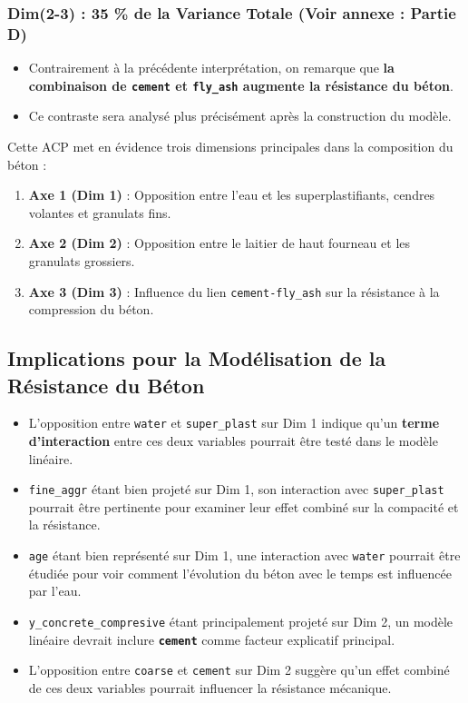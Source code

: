 \documentclass[
  12pt,
]{article}
\providecommand{\tightlist}{%
  \setlength{\itemsep}{0pt}\setlength{\parskip}{0pt}}
\begin{document}
\subsubsection{Dim(2-3) : 35 \% de la Variance Totale (Voir annexe :
Partie D)}\label{dim2-3-35-de-la-variance-totale-voir-annexe-partie-d}

\begin{itemize}
\tightlist
\item
  Contrairement à la précédente interprétation, on remarque que
  \textbf{la combinaison de \texttt{cement} et \texttt{fly\_ash}
  augmente la résistance du béton}.
\item
  Ce contraste sera analysé plus précisément après la construction du
  modèle.
\end{itemize}

Cette ACP met en évidence trois dimensions principales dans la
composition du béton :

\begin{enumerate}
\def\labelenumi{\arabic{enumi}.}
\tightlist
\item
  \textbf{Axe 1 (Dim 1)} : Opposition entre l'eau et les
  superplastifiants, cendres volantes et granulats fins.
\item
  \textbf{Axe 2 (Dim 2)} : Opposition entre le laitier de haut fourneau
  et les granulats grossiers.
\item
  \textbf{Axe 3 (Dim 3)} : Influence du lien \texttt{cement-fly\_ash}
  sur la résistance à la compression du béton.
\end{enumerate}

\subsection{Implications pour la Modélisation de la Résistance du
Béton}\label{implications-pour-la-moduxe9lisation-de-la-ruxe9sistance-du-buxe9ton}

\begin{itemize}
\tightlist
\item
  L'opposition entre \texttt{water} et \texttt{super\_plast} sur Dim 1
  indique qu'un \textbf{terme d'interaction} entre ces deux variables
  pourrait être testé dans le modèle linéaire.
\item
  \texttt{fine\_aggr} étant bien projeté sur Dim 1, son interaction avec
  \texttt{super\_plast} pourrait être pertinente pour examiner leur
  effet combiné sur la compacité et la résistance.
\item
  \texttt{age} étant bien représenté sur Dim 1, une interaction avec
  \texttt{water} pourrait être étudiée pour voir comment l'évolution du
  béton avec le temps est influencée par l'eau.
\item
  \texttt{y\_concrete\_compresive} étant principalement projeté sur Dim
  2, un modèle linéaire devrait inclure \textbf{\texttt{cement}} comme
  facteur explicatif principal.
\item
  L'opposition entre \texttt{coarse} et \texttt{cement} sur Dim 2
  suggère qu'un effet combiné de ces deux variables pourrait influencer
  la résistance mécanique.
\end{itemize}
\end{document}

